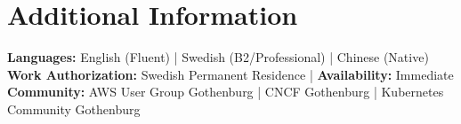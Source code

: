 \documentclass[a4paper,10pt]{article}
\begin{document}
\section*{Additional Information}
\textbf{Languages:} English (Fluent) | Swedish (B2/Professional) | Chinese (Native)\\
\textbf{Work Authorization:} Swedish Permanent Residence | \textbf{Availability:} Immediate\\
\textbf{Community:} AWS User Group Gothenburg | CNCF Gothenburg | Kubernetes Community Gothenburg
\end{document}
